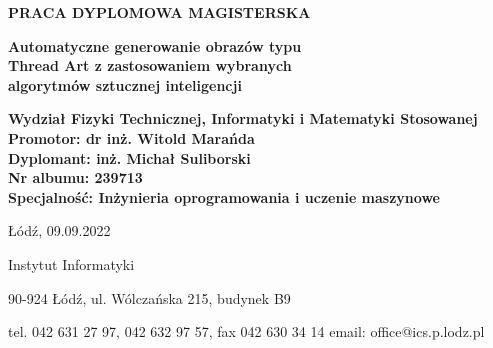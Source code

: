 {\begin{titlepage}
    \begin{center}
        \vspace*{1.53cm}
        {\selectfont\large
        \uppercase{\textbf{PRACA DYPLOMOWA MAGISTERSKA}}
        
        \vspace*{5.1cm}
        
        \fontsize{18pt}{22pt}\selectfont
        \textbf{Automatyczne generowanie obrazów typu\\Thread Art z zastosowaniem wybranych\\algorytmów sztucznej inteligencji}}
        
        \vfill
    \end{center}
    
    {\selectfont\normalsize
    \begin{adjustwidth}{1cm}{0pt}
    \begin{flushleft}
        \textbf{Wydział Fizyki Technicznej, Informatyki i Matematyki Stosowanej}\\
        \textbf{Promotor: dr inż. Witold Marańda}\\
        \textbf{Dyplomant: inż. Michał Suliborski}\\
        \textbf{Nr albumu: 239713}\\
        \textbf{Specjalność: Inżynieria oprogramowania i uczenie maszynowe}
    \end{flushleft}
    \end{adjustwidth}
    
    \begin{center}
        \L{}\'od\'z, 09.09.2022
        \vspace*{2.05cm}
    \end{center}}
    
    \begin{adjustwidth}{0cm}{0pt}
    \begin{flushleft}
        {\selectfont\footnotesize
        \textcolor{politechniczny}{Instytut Informatyki}}
        
        \vspace*{0.1cm}
        
        {\selectfont\tiny
        90-924 \L{}\'od\'z, ul. W\'olcza\'nska 215, \textcolor{politechniczny}{budynek B9}
        
        \vspace*{-0.5cm}
        
        tel. 042 631 27 97, 042 632 97 57, fax 042 630 34 14 email: office@ics.p.lodz.pl}
        
        \vspace{-1.4cm}
    \end{flushleft}
    \end{adjustwidth}
    
\end{titlepage}}
\renewcommand{\baselinestretch}{1.5}